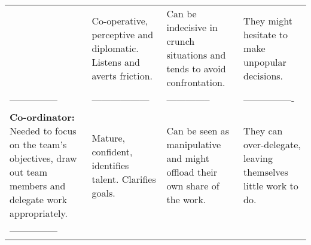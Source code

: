 \documentclass[]{book}
\begin{document}
\begin{longtable}[]{@{}llll@{}}
\begin{minipage}[t]{0.21\columnwidth}
\end{minipage} & \begin{minipage}[t]{0.25\columnwidth}\raggedright
Co-operative, perceptive and diplomatic. Listens and averts friction.\strut
\end{minipage} & \begin{minipage}[t]{0.20\columnwidth}\raggedright
Can be indecisive in crunch situations and tends to avoid confrontation.\strut
\end{minipage} & \begin{minipage}[t]{0.22\columnwidth}\raggedright
They might hesitate to make unpopular decisions.\strut
\end{minipage}\tabularnewline
\begin{minipage}[t]{0.21\columnwidth}\raggedright
---------------\strut
\end{minipage} & \begin{minipage}[t]{0.25\columnwidth}\raggedright
------------------\strut
\end{minipage} & \begin{minipage}[t]{0.20\columnwidth}\raggedright
--------------\strut
\end{minipage} & \begin{minipage}[t]{0.22\columnwidth}\raggedright
----------------\strut
\end{minipage}\tabularnewline
\begin{minipage}[t]{0.21\columnwidth}\raggedright
\textbf{Co-ordinator:} Needed to focus on the team's objectives, draw out team members and delegate work appropriately.\strut
\end{minipage} & \begin{minipage}[t]{0.25\columnwidth}\raggedright
Mature, confident, identifies talent. Clarifies goals.\strut
\end{minipage} & \begin{minipage}[t]{0.20\columnwidth}\raggedright
Can be seen as manipulative and might offload their own share of the work.\strut
\end{minipage} & \begin{minipage}[t]{0.22\columnwidth}\raggedright
They can over-delegate, leaving themselves little work to do.\strut
\end{minipage}\tabularnewline
\begin{minipage}[t]{0.21\columnwidth}\raggedright
---------------\strut
\end{minipage} & \begin{minipage}[t]{0.25\columnwidth}\raggedright

\end{minipage}
\end{longtable}
\end{document}
